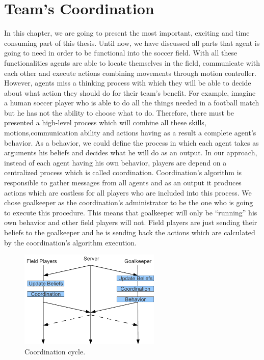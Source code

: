 \chapter{Team's Coordination}
\label{Coordination}

In this chapter, we are going to present the most important, exciting and time consuming part of this thesis. Until now, we have discussed all parts that agent is going to need in order to be functional into the soccer field.
With all these functionalities agents are able to locate themselves in the field, communicate with each other and execute actions combining movements through motion controller. However, agents miss a thinking process with which they will be able to decide about what action they should do for their team's benefit. For example, imagine a human soccer player who is able to do all the things needed in a football match but he has not the ability to choose what to do. Therefore, there must be presented a high-level process which will combine all these skills, motions,communication ability and actions having as a result a complete agent's behavior. As a behavior, we could define the process in which each agent takes as arguments his beliefs and decides what he will do as an output. In our approach, instead of each agent having his own behavior, players are depend on a centralized process which is called coordination.  Coordination's algorithm is responsible to gather messages from all agents and as an output it produces actions which are costless for all players who are included into this process. We chose goalkeeper as the coordination's administrator to be the one who is going to execute this procedure. This means that goalkeeper will only be ``running'' his own behavior and other field players will not. Field players are just sending their beliefs to the goalkeeper and he is sending back the actions which are calculated by the coordination's algorithm execution.
\begin{figure}[htb!]
\centering
  \includegraphics[width=0.6\textwidth]{Chapter4/figures/CoordinationCycle.pdf}
  \caption{Coordination cycle.} 
  \label{fig:CoordinationCycle}
\end{figure}


